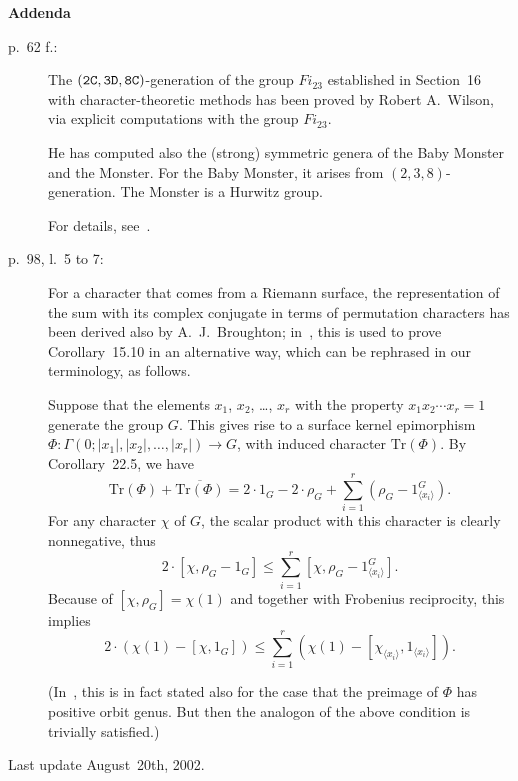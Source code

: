 \documentclass[12pt,twoside]{article}
\def\tthdump#1{#1}
\def\Span#1{\langle #1 \rangle}
\def\Spur{\textrm{Tr}}
\begin{document}
\vspace*{1cm}
\tthdump{\newpage}
\centerline{\large\bf Addenda}

\begin{description}
\item[p.~62 f.:]
    The $({\tt 2C}, {\tt 3D}, {\tt 8C})$-generation of the group $Fi_{23}$
    established in Section~16 with character-theoretic methods
    has been proved by Robert A.~Wilson,
    via explicit computations with the group $Fi_{23}$.

    He has computed also the (strong) symmetric genera of the Baby Monster
    and the Monster.
    For the Baby Monster, it arises from $(2,3,8)$-generation.
    The Monster is a Hurwitz group.

    For details, see~\cite{Wil93,Wil97,Wil01}.

\item[p.~98, l.~5 to 7:]
    For a character that comes from a Riemann surface,
    the representation of the sum with its complex conjugate
    in terms of permutation characters
    has been derived also by A.~J.~Broughton;
    in~\cite{Bro90}, this is used to prove Corollary~15.10 in an
    alternative way,
    which can be rephrased in our terminology, as follows.

    Suppose that the elements $x_1$, $x_2$, \ldots, $x_r$ with the
    property $x_1 x_2 \cdots x_r = 1$ generate the group $G$.
    This gives rise to a surface kernel epimorphism
    $\Phi : \Gamma(0;|x_1|, |x_2|, \ldots, |x_r|) \rightarrow G$,
    with induced character $\Spur(\Phi)$.
    By Corollary~22.5, we have
    $$\Spur(\Phi) + \overline{\Spur(\Phi)} = 2 \cdot 1_G - 2 \cdot \rho_G
    + \sum_{i=1}^r ( \rho_G - 1_{\Span{x_i}}^G ) .$$
    For any character $\chi$ of $G$, the scalar product with this character
    is clearly nonnegative, thus
    $$2 \cdot [ \chi , \rho_G - 1_G ]
    \leq \sum_{i=1}^r [ \chi , \rho_G - 1_{\Span{x_i}}^G ] .$$
    Because of $[ \chi , \rho_G ] = \chi(1)$ and together with
    Frobenius reciprocity, this implies
    $$2 \cdot ( \chi(1) - [ \chi , 1_G ] )
    \leq \sum_{i=1}^r ( \chi(1) - [ \chi_{\Span{x_i}} , 1_{\Span{x_i}} ] ) .$$

    (In~\cite{Bro90}, this is in fact stated also for the case that
    the preimage of $\Phi$ has positive orbit genus.
    But then the analogon of the above condition is trivially satisfied.)
\end{description}






Last update August~20th, 2002.
\end{document}
